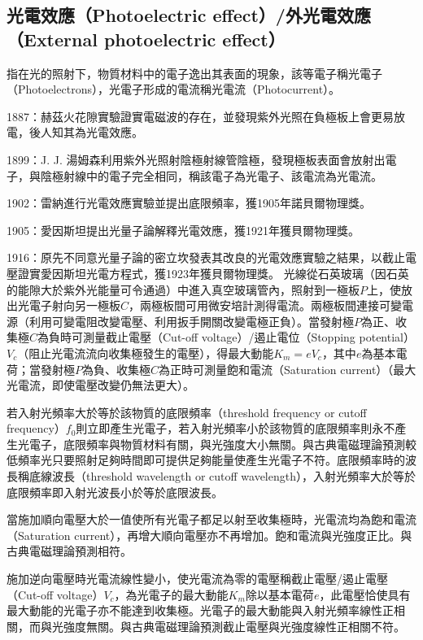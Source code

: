 \documentclass[a4paper,12pt]{article}
\begin{document}
\subsection{光電效應（Photoelectric effect）/外光電效應（External photoelectric effect）}
指在光的照射下，物質材料中的電子逸出其表面的現象，該等電子稱光電子（Photoelectrons），光電子形成的電流稱光電流（Photocurrent）。
\bit
\item 1887：赫茲火花隙實驗證實電磁波的存在，並發現紫外光照在負極板上會更易放電，後人知其為光電效應。
\item 1899：J. J. 湯姆森利用紫外光照射陰極射線管陰極，發現極板表面會放射出電子，與陰極射線中的電子完全相同，稱該電子為光電子、該電流為光電流。
\item 1902：雷納進行光電效應實驗並提出底限頻率，獲1905年諾貝爾物理獎。
\item 1905：愛因斯坦提出光量子論解釋光電效應，獲1921年獲貝爾物理獎。
\item 1916：原先不同意光量子論的密立坎發表其改良的光電效應實驗之結果，以截止電壓證實愛因斯坦光電方程式，獲1923年獲貝爾物理獎。
\eit
{}
光線從石英玻璃（因石英的能隙大於紫外光能量可令通過）中進入真空玻璃管內，照射到一極板$P$上，使放出光電子射向另一極板$C$，兩極板間可用微安培計測得電流。兩極板間連接可變電源（利用可變電阻改變電壓、利用扳手開關改變電極正負）。當發射極$P$為正、收集極$C$為負時可測量截止電壓（Cut-off voltage）/遏止電位（Stopping potential）$V_c$（阻止光電流流向收集極發生的電壓），得最大動能$K_m=eV_c$，其中$e$為基本電荷；當發射極$P$為負、收集極$C$為正時可測量飽和電流（Saturation current）（最大光電流，即使電壓改變仍無法更大）。
\bit
\item 若入射光頻率大於等於該物質的底限頻率（threshold frequency or cutoff frequency）$f_0$則立即產生光電子，若入射光頻率小於該物質的底限頻率則永不產生光電子，底限頻率與物質材料有關，與光強度大小無關。與古典電磁理論預測較低頻率光只要照射足夠時間即可提供足夠能量使產生光電子不符。底限頻率時的波長稱底線波長（threshold wavelength or cutoff wavelength），入射光頻率大於等於底限頻率即入射光波長小於等於底限波長。
\item 當施加順向電壓大於一值使所有光電子都足以射至收集極時，光電流均為飽和電流（Saturation current），再增大順向電壓亦不再增加。飽和電流與光強度正比。與古典電磁理論預測相符。
\item 施加逆向電壓時光電流線性變小，使光電流為零的電壓稱截止電壓/遏止電壓（Cut-off voltage）$V_c$，為光電子的最大動能$K_m$除以基本電荷$e$，此電壓恰使具有最大動能的光電子亦不能達到收集極。光電子的最大動能與入射光頻率線性正相關，而與光強度無關。與古典電磁理論預測截止電壓與光強度線性正相關不符。
\end{document}
